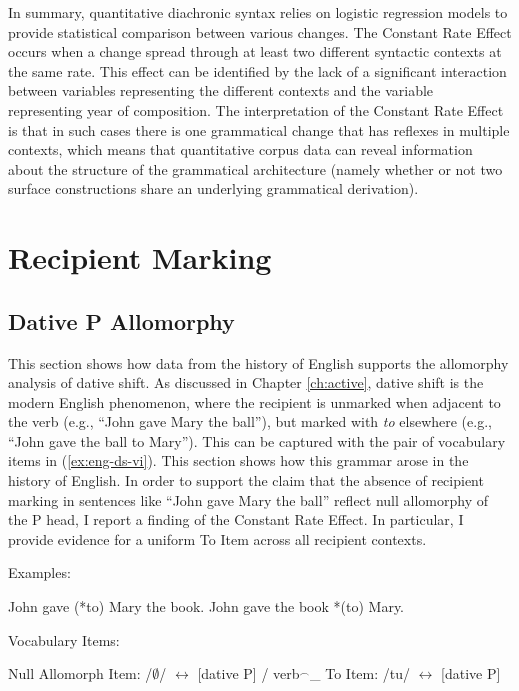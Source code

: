	In summary, quantitative diachronic syntax relies on logistic regression models to provide statistical comparison between various changes. The Constant Rate Effect occurs when a change spread through at least two different syntactic contexts at the same rate. This effect can be identified by the lack of a significant interaction between variables representing the different contexts and the variable representing year of composition. The interpretation of the Constant Rate Effect is that in such cases there is one grammatical change that has reflexes in multiple contexts, which means that quantitative corpus data can reveal information about the structure of the grammatical architecture (namely whether or not two surface constructions share an underlying grammatical derivation).

\section{Recipient Marking}
\subsection{Dative P Allomorphy}
This section shows how data from the history of English supports the allomorphy analysis of dative shift. As discussed in Chapter \ref{ch:active}, dative shift is the modern English phenomenon, where the recipient is unmarked when adjacent to the verb (e.g., ``John gave Mary the ball''), but marked with \textit{to} elsewhere (e.g., ``John gave the ball to Mary''). This can be captured with the pair of vocabulary items in (\ref{ex:eng-ds-vi}). This section shows how this grammar arose in the history of English. In order to support the claim that the absence of recipient marking in sentences like ``John gave Mary the ball'' reflect null allomorphy of the P head, I report a finding of the Constant Rate Effect. In particular, I provide evidence for a uniform To Item across all recipient contexts.  

	\begin{exe}
		\ex Examples:
		\begin{xlist}
			\ex John gave (*to) Mary the book.
			\ex John gave the book *(to) Mary.
		\end{xlist}
		\ex Vocabulary Items:\label{ex:eng-ds-vi}
		\begin{xlist}
			\ex Null Allomorph Item: /$\emptyset$/ $\leftrightarrow$ [dative P] / verb$^{\smallfrown}$\_
			\ex To Item: /tu/ $\leftrightarrow$ [dative P]
		\end{xlist}
	\end{exe}

